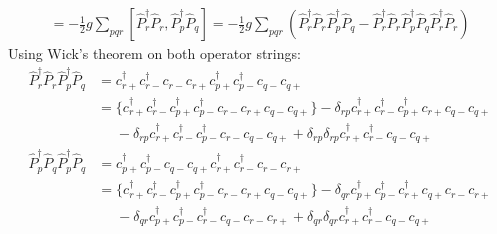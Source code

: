 \documentclass[norsk,a4paper,12pt]{article}
\begin{document}
\begin{align*}
[\hat{V},\hat{P}]=-\frac{1}{2}g\sum_{pqr}[\hat{P}_r^{\dagger}\hat{P}_r, \hat{P}_p^{\dagger}\hat{P}_q]=-\frac{1}{2}g\sum_{pqr}(\hat{P}_r^{\dagger}\hat{P}_r\hat{P}_p^{\dagger}\hat{P}_q-\hat{P}_r^{\dagger}\hat{P}_r\hat{P}_p^{\dagger}\hat{P}_q\hat{P}_r^{\dagger}\hat{P}_r)
\end{align*}
Using Wick's theorem on both operator strings:
\begin{align*}
\hat{P}_r^{\dagger}\hat{P}_r\hat{P}_p^{\dagger}\hat{P}_q&=c_{r+}^{\dagger}c_{r-}^{\dagger}c_{r-}c_{r+}c_{p+}^{\dagger}c_{p-}^{\dagger}c_{q-}c_{q+}\\
&=\{c_{r+}^{\dagger}c_{r-}^{\dagger}c_{p+}^{\dagger}c_{p-}^{\dagger}c_{r-}c_{r+}c_{q-}c_{q+}\}-\delta_{rp}c_{r+}^{\dagger}c_{r-}^{\dagger}c_{p+}^{\dagger}c_{r+}c_{q-}c_{q+}\\
&\mathrel{\phantom{=}}-\delta_{rp}c_{r+}^{\dagger}c_{r-}^{\dagger}c_{p-}^{\dagger}c_{r-}c_{q-}c_{q+}+\delta_{rp}\delta_{rp}c_{r+}^{\dagger}c_{r-}^{\dagger}c_{q-}c_{q+}
\end{align*}
\begin{align*}
\hat{P}_p^{\dagger}\hat{P}_q\hat{P}_p^{\dagger}\hat{P}_q&=c_{p+}^{\dagger}c_{p-}^{\dagger}c_{q-}c_{q+}c_{r+}^{\dagger}c_{r-}^{\dagger}c_{r-}c_{r+}\\
&=\{c_{r+}^{\dagger}c_{r-}^{\dagger}c_{p+}^{\dagger}c_{p-}^{\dagger}c_{r-}c_{r+}c_{q-}c_{q+}\}-\delta_{qr}c_{p+}^{\dagger}c_{p-}^{\dagger}c_{r+}^{\dagger}c_{q+}c_{r-}c_{r+}\\
&\mathrel{\phantom{=}}-\delta_{qr}c_{p+}^{\dagger}c_{p-}^{\dagger}c_{r-}^{\dagger}c_{q-}c_{r-}c_{r+}+\delta_{qr}\delta_{qr}c_{r+}^{\dagger}c_{r-}^{\dagger}c_{q-}c_{q+}
\end{align*}
\end{document}
